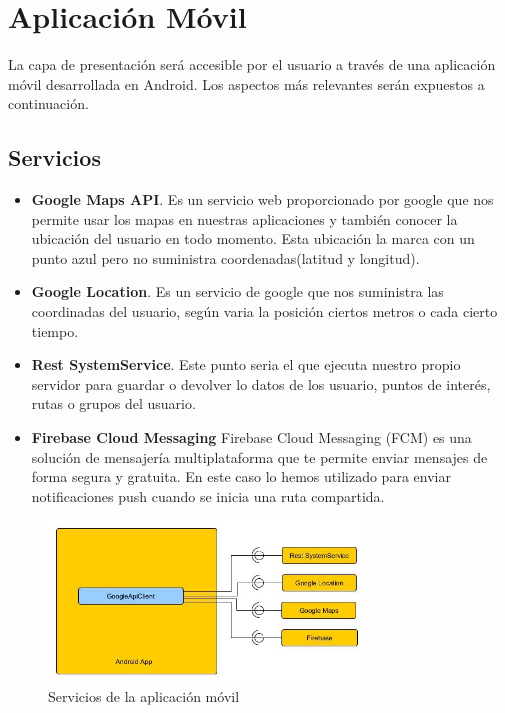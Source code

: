 \section{Aplicación Móvil}
La capa de presentación será accesible por el usuario a través de una aplicación móvil desarrollada en Android. Los aspectos más relevantes serán expuestos a continuación.

\subsection{Servicios}
\begin{itemize}
\item \textbf{Google Maps API}. Es un servicio web proporcionado por google que nos permite usar los mapas en nuestras aplicaciones y también conocer la ubicación del usuario  en todo momento. Esta ubicación la marca con un punto azul pero no suministra coordenadas(latitud y longitud).
\item \textbf{Google Location}. Es un servicio de google que nos suministra las coordinadas del usuario, según varia la posición ciertos metros o cada cierto tiempo.
\item \textbf{Rest SystemService}. Este punto seria el que ejecuta nuestro propio servidor para guardar o devolver lo datos de los usuario, puntos de interés, rutas o grupos del usuario.
\item \textbf{Firebase Cloud Messaging} Firebase Cloud Messaging (FCM) es una solución de mensajería multiplataforma que te permite enviar mensajes de forma segura y gratuita. En este caso lo hemos utilizado para enviar notificaciones push cuando se inicia una ruta compartida.
\end{itemize}
\begin{figure}[H]
		\centering
		\includegraphics[width=0.75\textwidth] {arquitectura-movil.jpg}
		\caption{Servicios de la aplicación móvil }
	\end{figure}
	
	
